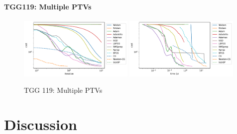 \documentclass[a4paper]{article}
\begin{document}
	\paragraph{TGG119: Multiple PTVs}
	\begin{figure}[H]
		\centering
		\includegraphics[width=0.49\textwidth]{figures/TGG119Multi-iter.pdf}		\includegraphics[width=0.49\textwidth]{figures/TGG119Multi-time.pdf}
		\caption{TGG 119: Multiple PTVs}
		\label{fig:tgg119multi}
	\end{figure}
	
	
	
	\section{Discussion}
	
	
	
	
\end{document}
